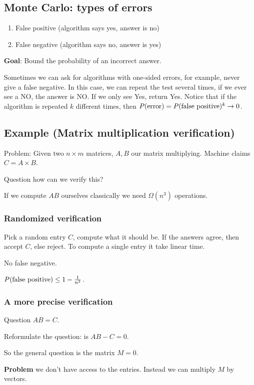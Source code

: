 \documentclass[11pt]{article}
\begin{document}
\subsection{Monte Carlo: types of errors}
\label{sec:org2f71eea}
\begin{enumerate}
\item False positive (algorithm says yes, answer is no)
\item False negative (algorithm says no, answer is yes)
\end{enumerate}

\textbf{Goal}: Bound the probability of an incorrect answer.

Sometimes we can ask for algorithms with one-sided errors, for example, never
give a false negative. In this case, we can repeat the test several times, if
we ever see a NO, the answer is NO. If we only see Yes, return Yes. Notice
that if the algorithm is repeated \(k\) different times, then
\(P(\textup{error}) = P(\textup{false positive})^k \rightarrow 0\).
\subsection{Example (Matrix multiplication verification)}
\label{sec:org692471a}
Problem: Given two \(n\times m\) matrices, \(A, B\) our matrix multiplying.
Machine claims \(C = A \times B\).

Question how can we verify this?

If we compute \(AB\) ourselves classically we need \(\Omega(n^3)\) operations.
\subsubsection{Randomized verification}
\label{sec:org4b524cb}
Pick a random entry \(C\), compute what it should be. If the answers agree,
then accept \(C\), else reject. To compute a single entry it take linear time.

No false negative.

\(P(\textup{false positive}) \le 1 - \frac{1}{n^2}\).
\subsubsection{A more precise verification}
\label{sec:orga0b540c}
Question \(AB = C\).

Reformulate the question: is \(AB - C = 0\).

So the general question is the matrix \(M = 0\).

\textbf{Problem} we don't have access to the entries. Instead we can multiply \(M\)
by vectors.
\end{document}
